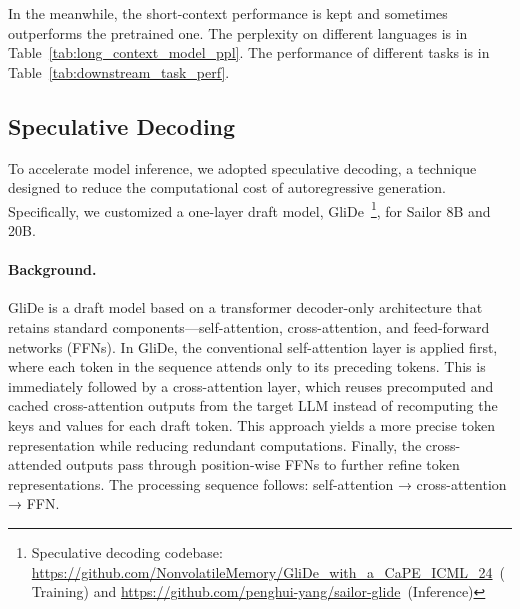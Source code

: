 In the meanwhile, the short-context performance is kept and sometimes outperforms the pretrained one. 
The perplexity on different languages is in Table~\ref{tab:long_context_model_ppl}.
The performance of different tasks is in Table~\ref{tab:downstream_task_perf}.

\vspace{-2mm}






\subsection{Speculative Decoding}
To accelerate model inference, we adopted speculative decoding, a technique designed to reduce the computational cost of autoregressive generation. Specifically, we customized a one-layer draft model, GliDe~\citep{du2024glide}\footnote{Speculative decoding codebase: \url{https://github.com/NonvolatileMemory/GliDe_with_a_CaPE_ICML_24}~(Training) and \url{https://github.com/penghui-yang/sailor-glide}~(Inference)}, for Sailor 8B and 20B.

\paragraph{Background.} GliDe is a draft model based on a transformer decoder-only architecture that retains standard components—self-attention, cross-attention, and feed-forward networks (FFNs). In GliDe, the conventional self-attention layer is applied first, where each token in the sequence attends only to its preceding tokens. This is immediately followed by a cross-attention layer, which reuses precomputed and cached cross-attention outputs from the target LLM instead of recomputing the keys and values for each draft token. This approach yields a more precise token representation while reducing redundant computations. Finally, the cross-attended outputs pass through position-wise FFNs to further refine token representations. The processing sequence follows: self-attention → cross-attention → FFN.

